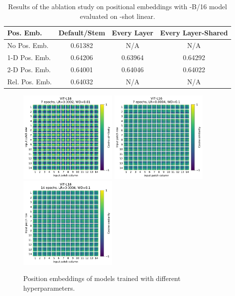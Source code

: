 \begin{table}[t]
\centering
\begin{tabular}{l c c c}
\toprule
Pos. Emb. & Default/Stem & Every Layer & Every Layer-Shared \\
\midrule
No Pos. Emb. & 0.61382  & N/A & N/A \\
1-D Pos. Emb. & 0.64206 & 0.63964 & 0.64292 \\
2-D Pos. Emb. &  0.64001 & 0.64046  & 0.64022 \\
Rel. Pos. Emb. & 0.64032 & N/A & N/A \\
\bottomrule
\end{tabular}
\caption{Results of the ablation study on positional embeddings with \oursabbrv-B/16 model evaluated on -shot linear.}
\label{tbl:pos_emb_abblation}
\end{table}

\begin{figure}[t]
\includegraphics[height=1.8in,trim={0in 0in 0.65in 0in},clip]{images/visualizations/20200930_position_embeddings_16490619_1.pdf}
\hfill
\includegraphics[height=1.8in,trim={0in 0in 0.65in 0in},clip]{images/visualizations/20200930_position_embeddings_17192124_1.pdf}
\hfill
\includegraphics[height=1.8in,trim={0in 0in 0in 0in},clip]{images/visualizations/20200930_position_embeddings_17192217_1.pdf}
\caption{Position embeddings of models trained with different hyperparameters.}
\label{fig:position_embedding_comparison}
\end{figure}

